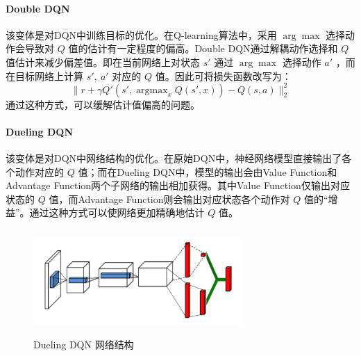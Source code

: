 \documentclass[a4paper,12pt]{article}
\begin{document}
\begin{CJK}{UTF8}{gbsn}
\paragraph{Double DQN} 该变体是对DQN中训练目标的优化。在Q-learning算法中，采用 $\arg\max$ 选择动作会导致对 $Q$ 值的估计有一定程度的偏高\cite{ref2}。Double DQN通过解耦动作选择和 $Q$ 值估计来减少偏差值。即在当前网络上对状态 $s'$ 通过 $\arg\max$ 选择动作 $a'$ ，而在目标网络上计算 $s',\ a'$ 对应的 $Q$ 值。因此可将损失函数改写为：
$$
\|r+\gamma Q'(s',\mathop{\arg\max}_{x} Q(s',x))-Q(s,a)\|_2^2
$$
通过这种方式，可以缓解估计值偏高的问题。
\paragraph{Dueling DQN} 该变体是对DQN中网络结构的优化。在原始DQN中，神经网络模型直接输出了各个动作对应的 $Q$ 值；而在Dueling DQN中，模型的输出会由Value Function和Advantage Function两个子网络的输出相加获得。其中Value Function仅输出对应状态的 $Q$ 值，而Advantage Function则会输出对应状态各个动作对 $Q$ 值的“增益”。通过这种方式可以使网络更加精确地估计 $Q$ 值。
\begin{figure}[h!]
\centering
\includegraphics[width=8cm,height=4cm]{./resource/dueling_architecture.png}
\caption{Dueling DQN 网络结构\cite{ref3}}
\end{figure}
\newpage

\end{CJK}
\end{document}
